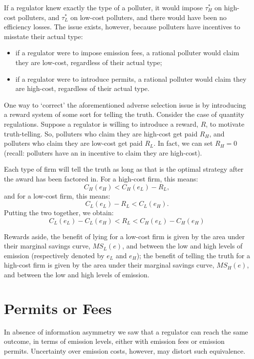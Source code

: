 \documentclass[
]{book}
\providecommand{\tightlist}{%
  \setlength{\itemsep}{0pt}\setlength{\parskip}{0pt}}
\begin{document}
If a regulator knew exactly the type of a polluter, it would impose \(\tau_H^*\) on high-cost polluters, and \(\tau_L^*\) on low-cost polluters, and there would have been no efficiency losses. The issue exists, however, because polluters have incentives to misstate their actual type:

\begin{itemize}
\tightlist
\item
  if a regulator were to impose emission fees, a rational polluter would claim they are low-cost, regardless of their actual type;
\item
  if a regulator were to introduce permits, a rational polluter would claim they are high-cost, regardless of their actual type.
\end{itemize}

One way to `correct' the aforementioned adverse selection issue is by introducing a reward system of some sort for telling the truth. Consider the case of quantity regulations. Suppose a regulator is willing to introduce a reward, \(R\), to motivate truth-telling. So, polluters who claim they are high-cost get paid \(R_H\), and polluters who claim they are low-cost get paid \(R_L\). In fact, we can set \(R_H=0\) (recall: polluters have an in incentive to claim they are high-cost).

Each type of firm will tell the truth as long as that is the optimal strategy after the award has been factored in. For a high-cost firm, this means: \[C_H(e_H) < C_H(e_L)-R_L,\] and for a low-cost firm, this means: \[C_L(e_L)-R_L < C_L(e_H).\] Putting the two together, we obtain: \[C_L(e_L) - C_L(e_H) < R_L < C_H(e_L) - C_H(e_H)\]

Rewards aside, the benefit of lying for a low-cost firm is given by the area under their marginal savings curve, \(MS_L(e)\), and between the low and high levels of emission (respectively denoted by \(e_L\) and \(e_H\)); the benefit of telling the truth for a high-cost firm is given by the area under their marginal savings curve, \(MS_H(e)\), and between the low and high levels of emission.

\hypertarget{permits-or-fees}{%
\section{Permits or Fees}\label{permits-or-fees}}

In absence of information asymmetry we saw that a regulator can reach the same outcome, in terms of emission levels, either with emission fees or emission permits. Uncertainty over emission costs, however, may distort such equivalence.
\end{document}

